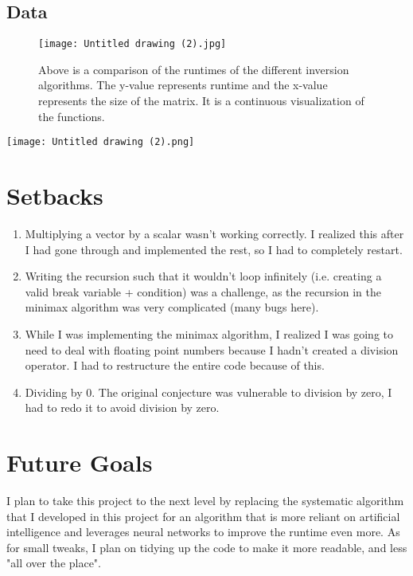 \documentclass{article}
\begin{document}
\subsection*{Data}
\begin{figure}[h!]
\centering
\texttt{[image: Untitled drawing (2).jpg]}
\caption{Above is a comparison of the runtimes of the different inversion algorithms. The y-value represents runtime and the x-value represents the size of the matrix. It is a continuous visualization of the functions.}
\end{figure}
\begin{center}\texttt{[image: Untitled drawing (2).png]}\end{center}

\section*{Setbacks}
\begin{enumerate}
\item Multiplying a vector by a scalar wasn’t working correctly. I realized       this after I had gone through and implemented the rest, so I had to         completely restart.
\item Writing the recursion such that it wouldn’t loop infinitely (i.e.           creating a valid break variable + condition) was a challenge, as the        recursion in the minimax algorithm was very complicated (many bugs          here).
\item While I was implementing the minimax algorithm, I realized I was going       to need to deal with floating point numbers because I hadn’t created a       division operator. I had to restructure the entire code because of          this.
\item Dividing by 0. The original conjecture was vulnerable to division by        zero, I had to redo it to avoid division by zero.
\end{enumerate}

\section*{Future Goals}
I plan to take this project to the next level by replacing the systematic algorithm that I developed in this project for an algorithm that is more reliant on artificial intelligence and leverages neural networks to improve the runtime even more. As for small tweaks, I plan on tidying up the code to make it more readable, and less "all over the place".
\newpage
\end{document}

